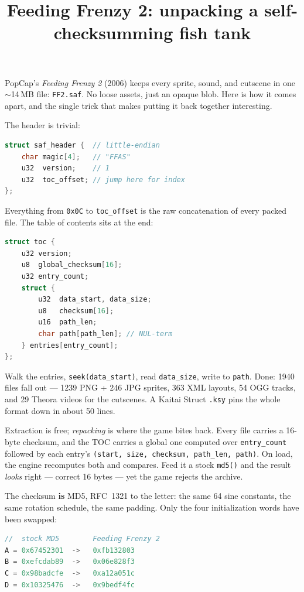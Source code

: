 \documentclass[10pt]{article}
\title{Feeding Frenzy 2: unpacking a self-checksumming fish tank}
\author{}
\makeatletter
\renewcommand{\maketitle}{
\begin{flushleft}
{\noindent\Huge\bf\@title}\break
\end{flushleft}
}
\makeatother
\begin{document}
\maketitle

\bigskip

PopCap's \textit{Feeding Frenzy 2} (2006) keeps every sprite, sound, and
cutscene in one $\sim$14\,MB file: \texttt{FF2.saf}. No loose assets, just an
opaque blob. Here is how it comes apart, and the single trick that makes
putting it back together interesting.

The header is trivial:

\begin{lstlisting}[language=C]
struct saf_header {  // little-endian
    char magic[4];   // "FFAS"
    u32  version;    // 1
    u32  toc_offset; // jump here for index
};
\end{lstlisting}

Everything from \texttt{0x0C} to \texttt{toc\_offset} is the raw concatenation
of every packed file. The table of contents sits at the end:

\begin{lstlisting}[language=C]
struct toc {
    u32 version;
    u8  global_checksum[16];
    u32 entry_count;
    struct {
        u32  data_start, data_size;
        u8   checksum[16];
        u16  path_len;
        char path[path_len]; // NUL-term
    } entries[entry_count];
};
\end{lstlisting}

Walk the entries, \texttt{seek(data\_start)}, read \texttt{data\_size}, write
to \texttt{path}. Done: 1940 files fall out --- 1239 PNG + 246 JPG sprites, 363
XML layouts, 54 OGG tracks, and 29 Theora videos for the cutscenes. A Kaitai
Struct \texttt{.ksy} pins the whole format down in about 50 lines.

Extraction is free; \textit{repacking} is where the game
bites back. Every file carries a 16-byte checksum, and the TOC carries a global
one computed over \texttt{entry\_count} followed by each entry's
\texttt{(start, size, checksum, path\_len, path)}. On load, the engine
recomputes both and compares. Feed it a stock \texttt{md5()} and the result
\textit{looks} right --- correct 16 bytes --- yet the game rejects the archive.

The checksum \textbf{is} MD5, RFC~1321 to the letter: the same 64 sine
constants, the same rotation schedule, the same padding. Only the four
initialization words have been swapped:

\begin{lstlisting}[language=C]
//  stock MD5        Feeding Frenzy 2
A = 0x67452301  ->   0xfb132803
B = 0xefcdab89  ->   0x06e828f3
C = 0x98badcfe  ->   0xa12a051c
D = 0x10325476  ->   0x9bedf4fc
\end{lstlisting}
\end{document}
